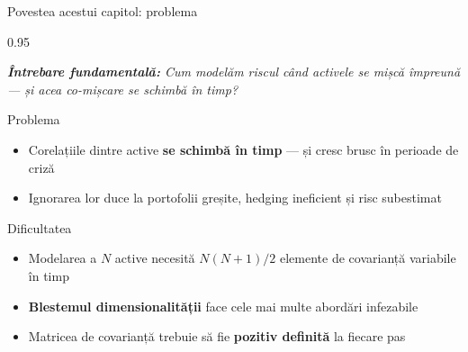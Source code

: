 \documentclass[9pt, aspectratio=169, t]{beamer}
\begin{document}
\begin{frame}{Povestea acestui capitol: problema}
    \begin{cminipage}{0.95\textwidth}
    {\footnotesize
    \textit{\textbf{Întrebare fundamentală:} Cum modelăm riscul când activele se mișcă împreună --- și acea co-mișcare se schimbă în timp?}
    \vspace{0.2cm}
    \begin{block}{Problema}
        \begin{itemize}\setlength{\itemsep}{2pt}
            \item Corelațiile dintre active \textbf{se schimbă în timp} --- și cresc brusc în perioade de criză
            \item Ignorarea lor duce la portofolii greșite, hedging ineficient și risc subestimat
        \end{itemize}
    \end{block}
    \vspace{0.1cm}
    \begin{alertblock}{Dificultatea}
        \begin{itemize}\setlength{\itemsep}{2pt}
            \item Modelarea a $N$ active necesită $N(N+1)/2$ elemente de covarianță variabile în timp
            \item \textbf{Blestemul dimensionalității} face cele mai multe abordări infezabile
            \item Matricea de covarianță trebuie să fie \textbf{pozitiv definită} la fiecare pas
        \end{itemize}
    \end{alertblock}
    }
    \end{cminipage}
\end{frame}
\end{document}
